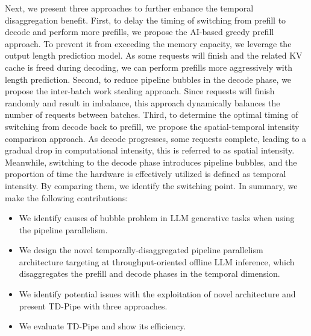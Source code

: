 Next, we present three approaches to further enhance the temporal disaggregation benefit.
First, to delay the timing of switching from prefill to decode and perform more prefills, we propose the AI-based greedy prefill approach.
To prevent it from exceeding the memory capacity, we leverage the output length prediction model.
As some requests will finish and the related KV cache is freed during decoding, we can perform prefills more aggressively with length prediction. 
Second, to reduce pipeline bubbles in the decode phase, we propose the inter-batch work stealing approach.
Since requests will finish randomly and result in imbalance, this approach dynamically balances the number of requests between batches.
Third, to determine the optimal timing of switching from decode back to prefill, we propose the spatial-temporal intensity comparison approach.
As decode progresses, some requests complete, leading to a gradual drop in computational intensity, this is referred to as spatial intensity.
Meanwhile, switching to the decode phase introduces pipeline bubbles, and the proportion of time the hardware is effectively utilized is defined as temporal intensity.
By comparing them, we identify the switching point.
In summary, we make the following contributions:
\begin{itemize}[leftmargin=*]
    \item We identify causes of bubble problem in LLM generative tasks when using the pipeline parallelism. 
    \item We design the novel temporally-disaggregated pipeline parallelism architecture targeting at throughput-oriented offline LLM inference, which disaggregates the prefill and decode phases in the temporal dimension.
    \item We identify potential issues with the exploitation of novel architecture and present TD-Pipe with three approaches.
    \item We evaluate TD-Pipe and show its efficiency.
\end{itemize}